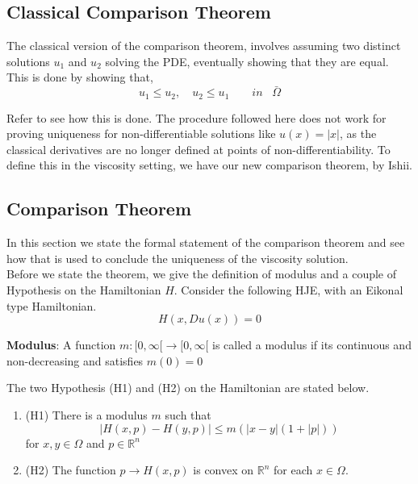 \subsection{Classical Comparison Theorem}
The classical version of the comparison theorem, involves assuming two
distinct solutions $u_1$ and $u_2$ solving the PDE, eventually showing
that they are equal. This is done by showing that,
\begin{equation}
  u_1 \le u_2, \quad u_2 \le u_1 \qquad in \;\;\; \bar{\Omega}
\end{equation}

\noindent
Refer \cite{yong} to see how this is done. The procedure followed here does not work for proving uniqueness for non-differentiable
solutions like $u(x) = \lvert x \rvert$, as the classical derivatives
are no longer defined at points of non-differentiability. To define
this in the viscosity setting, we have our new comparison theorem, by Ishii\cite{ishii}.

\subsection{Comparison Theorem}
In this section we state the formal statement of the comparison
theorem and see how that is used to conclude the uniqueness of the
viscosity solution.\\

\noindent
Before we state the theorem, we give the definition of modulus and a
couple of Hypothesis on the Hamiltonian $H$. Consider the following
HJE, with an Eikonal type Hamiltonian.
\begin{equation}
  H(x,Du(x)) = 0
\end{equation}

\begin{definition}
  \textbf{Modulus}: A function $m:[0,\infty[ \to [0,\infty[$ is called
  a modulus if its continuous and non-decreasing and satisfies $m(0) =
  0$
\end{definition}

\noindent
The two Hypothesis (H1) and (H2) on the Hamiltonian are stated below.
\begin{enumerate}
\item
  (H1) There is a modulus $m$ such that
  \begin{equation}
    \lvert H(x,p) - H(y,p)\rvert \le m (\lvert x-y \rvert (1+\lvert p \rvert))
  \end{equation}
  for $x,y \in \Omega$ and $p \in \mathbb{R}^n$
\item
  (H2) The function $p \to H(x,p)$ is convex on $\mathbb{R}^n$ for
  each $x \in \Omega$.

\end{enumerate}


